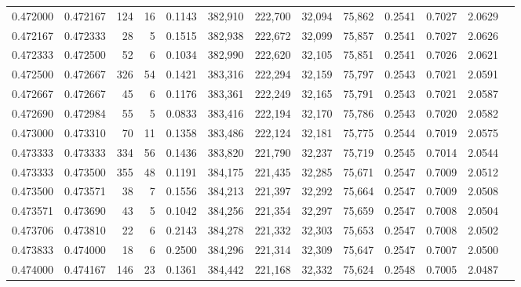 \begin{tabular}{rrrrrrrrrrrrr}
0.472000 & 0.472167 &   124 &  16 &                                     0.1143 & 382,910 & 222,700 &  32,094 &  75,862 & 0.2541 & 0.7027 & 2.0629 \\
0.472167 & 0.472333 &    28 &   5 &                                     0.1515 & 382,938 & 222,672 &  32,099 &  75,857 & 0.2541 & 0.7027 & 2.0626 \\
0.472333 & 0.472500 &    52 &   6 &                                     0.1034 & 382,990 & 222,620 &  32,105 &  75,851 & 0.2541 & 0.7026 & 2.0621 \\
0.472500 & 0.472667 &   326 &  54 &                                     0.1421 & 383,316 & 222,294 &  32,159 &  75,797 & 0.2543 & 0.7021 & 2.0591 \\
0.472667 & 0.472667 &    45 &   6 &                                     0.1176 & 383,361 & 222,249 &  32,165 &  75,791 & 0.2543 & 0.7021 & 2.0587 \\
0.472690 & 0.472984 &    55 &   5 &                                     0.0833 & 383,416 & 222,194 &  32,170 &  75,786 & 0.2543 & 0.7020 & 2.0582 \\
0.473000 & 0.473310 &    70 &  11 &                                     0.1358 & 383,486 & 222,124 &  32,181 &  75,775 & 0.2544 & 0.7019 & 2.0575 \\
0.473333 & 0.473333 &   334 &  56 &                                     0.1436 & 383,820 & 221,790 &  32,237 &  75,719 & 0.2545 & 0.7014 & 2.0544 \\
0.473333 & 0.473500 &   355 &  48 &                                     0.1191 & 384,175 & 221,435 &  32,285 &  75,671 & 0.2547 & 0.7009 & 2.0512 \\
0.473500 & 0.473571 &    38 &   7 &                                     0.1556 & 384,213 & 221,397 &  32,292 &  75,664 & 0.2547 & 0.7009 & 2.0508 \\
0.473571 & 0.473690 &    43 &   5 &                                     0.1042 & 384,256 & 221,354 &  32,297 &  75,659 & 0.2547 & 0.7008 & 2.0504 \\
0.473706 & 0.473810 &    22 &   6 &                                     0.2143 & 384,278 & 221,332 &  32,303 &  75,653 & 0.2547 & 0.7008 & 2.0502 \\
0.473833 & 0.474000 &    18 &   6 &                                     0.2500 & 384,296 & 221,314 &  32,309 &  75,647 & 0.2547 & 0.7007 & 2.0500 \\
0.474000 & 0.474167 &   146 &  23 &                                     0.1361 & 384,442 & 221,168 &  32,332 &  75,624 & 0.2548 & 0.7005 & 2.0487 \\

\end{tabular}
